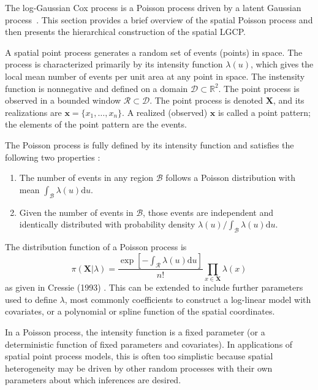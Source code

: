 \documentclass[]{interact}
\begin{document}

The log-Gaussian Cox process is a Poisson process driven by a latent Gaussian
process~\cite{moelleretal}. This section provides a brief overview of the
spatial Poisson process and then presents the hierarchical construction of the
spatial LGCP.

A spatial point process generates a random set of events (points) in space.
The process is characterized primarily by its intensity function
\(\lambda(u)\), which gives the local mean number of events per unit area at
any point in space. The instensity function is nonnegative and defined on a
domain \(\mathcal{D} \subset \mathbb{R}^{2}\). The point process is observed
in a bounded window \(\mathcal{R} \subset \mathcal{D}\). The point process is
denoted \(\mathbf{X}\), and its realizations are \(\mathbf{x} = \{x_{1},
\dots, x_{n}\}\). A realized (observed) \(\mathbf{x}\) is called a point
pattern; the elements of the point pattern are the events.

The Poisson process is fully defined by its intensity function and satisfies
the following two properties \cite{moellerwaagepetersen}:
\begin{enumerate}
\item The number of events in any region \(\mathcal{B}\) follows a Poisson
distribution with mean
\(\int_{\mathcal{B}} \lambda(u)\mathrm{d}u\).
\item Given the number of events in \(\mathcal{B}\), those events are
independent and identically distributed with probability density
\(\lambda(u) / \int_{\mathcal{B}} \lambda(u)\mathrm{d}u\).
\end{enumerate}
The distribution function of a Poisson process is
\begin{displaymath}
\pi(\mathbf{X}|\lambda)
= \frac{\exp\left[-\int_{\mathcal{R}} \lambda(u) \mathrm{d}u\right]}
{n!} \prod_{x \in \mathbf{X}} \lambda(x)
\end{displaymath}
as given in Cressie (1993) \cite{cressie}. This can be extended to include
further parameters used to define \(\lambda\), most commonly coefficients
to construct a log-linear model with covariates, or a polynomial or spline
function of the spatial coordinates.

In a Poisson process, the intensity function is a fixed parameter (or a
deterministic function of fixed parameters and covariates). In applications of
spatial point process models, this is often too simplistic because spatial
heterogeneity may be driven by other random processes with their own parameters
about which inferences are desired.
\end{document}
